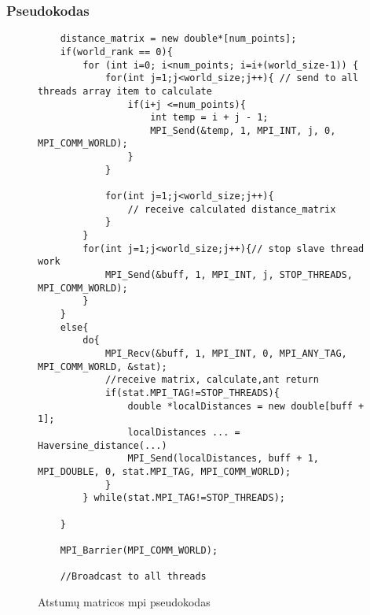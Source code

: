 \documentclass[a4paper,10pt]{article}
\begin{document}
\subsubsection{Pseudokodas}
\begin{figure}[hbt!]
	\begin{verbatim}
    distance_matrix = new double*[num_points];
    if(world_rank == 0){
        for (int i=0; i<num_points; i=i+(world_size-1)) {
            for(int j=1;j<world_size;j++){ // send to all threads array item to calculate
                if(i+j <=num_points){
                    int temp = i + j - 1;
                    MPI_Send(&temp, 1, MPI_INT, j, 0, MPI_COMM_WORLD);
                }
            }

            for(int j=1;j<world_size;j++){ 
                // receive calculated distance_matrix
            }
        }
        for(int j=1;j<world_size;j++){// stop slave thread work
            MPI_Send(&buff, 1, MPI_INT, j, STOP_THREADS, MPI_COMM_WORLD);
        }
    }
    else{
        do{
            MPI_Recv(&buff, 1, MPI_INT, 0, MPI_ANY_TAG, MPI_COMM_WORLD, &stat); 
            //receive matrix, calculate,ant return
            if(stat.MPI_TAG!=STOP_THREADS){
                double *localDistances = new double[buff + 1];
                localDistances ... = Haversine_distance(...)
                MPI_Send(localDistances, buff + 1, MPI_DOUBLE, 0, stat.MPI_TAG, MPI_COMM_WORLD);
            }
        } while(stat.MPI_TAG!=STOP_THREADS);

    }

    MPI_Barrier(MPI_COMM_WORLD);

    //Broadcast to all threads
\end{verbatim}
	\caption{Atstumų matricos mpi pseudokodas}
	\label {atstumų matricos pseudokodas}
\end{figure}

\newpage
\end{document}
